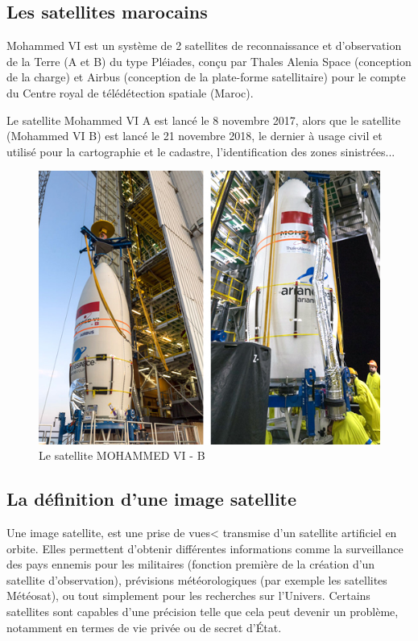 \documentclass[12pt, openany]{report}
\begin{document}
\subsection{Les satellites marocains}
Mohammed VI est un système de 2 satellites de reconnaissance et d'observation de la Terre (A et B) du type Pléiades, conçu par Thales Alenia Space (conception de la charge) et Airbus (conception de la plate-forme satellitaire) pour le compte du Centre royal de télédétection spatiale (Maroc).
\par
Le satellite Mohammed VI A est lancé le 8 novembre 2017, alors que le satellite (Mohammed VI B) est lancé le 21 novembre 2018, le dernier à usage civil et utilisé pour la cartographie et le cadastre, l’identification des zones sinistrées...
\begin{figure}[H]
\centering
\includegraphics[scale=0.5]{satm6.jpg}
\caption{Le satellite MOHAMMED VI - B}
\end{figure}


\subsection{La définition d'une image satellite}
Une image satellite, est une prise de vues< transmise d'un satellite artificiel en orbite. Elles permettent d'obtenir différentes informations comme la surveillance des pays ennemis pour les militaires (fonction première de la création d'un satellite d'observation), prévisions météorologiques (par exemple les satellites Météosat), ou tout simplement pour les recherches sur l'Univers. Certains satellites sont capables d'une précision telle que cela peut devenir un problème, notamment en termes de vie privée ou de secret d'État. 
\end{document}
